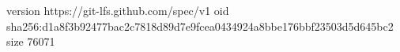 version https://git-lfs.github.com/spec/v1
oid sha256:d1a8f3b92477bac2c7818d89d7e9fcea0434924a8bbe176bbf23503d5d645bc2
size 76071
